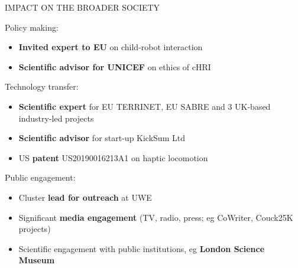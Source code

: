 \documentclass[xcolor=table]{beamer}
\makeatletter
\let\beamer@writeslidentry@miniframeson=\beamer@writeslidentry
\def\beamer@writeslidentry@miniframesoff{%
  \expandafter\beamer@ifempty\expandafter{\beamer@framestartpage}{}%
  {%
    \clearpage\beamer@notesactions%
  }
}
\newcommand*{\miniframeson}{\let\beamer@writeslidentry=\beamer@writeslidentry@miniframeson}
\newcommand*{\miniframesoff}{\let\beamer@writeslidentry=\beamer@writeslidentry@miniframesoff}
\makeatother
\begin{document}
\begin{frame}{IMPACT ON THE BROADER SOCIETY}

    Policy making:

    \begin{itemize}
        \item \textbf{Invited expert to EU} on child-robot interaction
        \item \textbf{Scientific advisor for UNICEF} on ethics of cHRI
    \end{itemize}

    Technology transfer:
    \begin{itemize}
        \item \textbf{Scientific expert} for EU TERRINET, EU SABRE and 3 UK-based
            industry-led projects
        \item \textbf{Scientific advisor} for start-up KickSum Ltd
        \item US \textbf{patent} US20190016213A1 on haptic locomotion
    \end{itemize}

    Public engagement:
    \begin{itemize}
        \item Cluster \textbf{lead for outreach} at UWE
        \item Significant \textbf{media engagement} (TV, radio, press; eg CoWriter, Couck25K projects)
        \item Scientific engagement with public institutions, eg \textbf{London
            Science Museum}
    \end{itemize}

\end{frame}


\miniframesoff{}

\miniframeson{}

\end{document}
